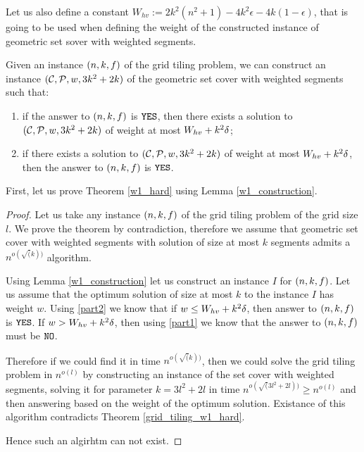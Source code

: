 Let us also define a constant $W_{hv} := 2k^2(n^2+1) -4k^2\epsilon -4k(1-\epsilon)$,
that is going to be used when defining the weight of the constructed
instance of geometric set sover with weighted segments.


\begin{lemma}
\label{w1_construction}
Given an instance $(n,k,f)$ of the grid tiling problem,
we can construct an instance $(\mathcal{C}, \mathcal{P}, w, 3k^2+2k)$ of the geometric set cover
with weighted segments such that:
\begin{enumerate}[label={(\arabic*)}]
\item \label{part1} if the answer to $(n,k,f)$ is $\texttt{YES}$, then there exists a solution
to $(\mathcal{C}, \mathcal{P}, w, 3k^2+2k)$ of weight at most $W_{hv} +k^2\delta$;
\item \label{part2} if there exists a solution to $(\mathcal{C}, \mathcal{P}, w, 3k^2+2k)$ of weight at most $W_{hv} +k^2\delta$,
then the answer to $(n,k,f)$ is $\texttt{YES}$.
\end{enumerate}
\end{lemma}


First, let us prove Theorem \ref{w1_hard} using Lemma \ref{w1_construction}.

\begin{proof}
Let us take any instance $(n,k,f)$ of the grid tiling problem
of the grid size $l$.
We prove the theorem by contradiction, therefore we assume
that geometric set cover with weighted segments
with solution of size at most $k$ segments admits a $n^{o(\sqrt(k))}$ algorithm.

Using Lemma \ref{w1_construction} let us construct an instance $I$
for $(n,k,f)$.
Let us assume that the optimum solution of size at most $k$
to the instance $I$ has weight $w$.
Using \ref{part2} we know that if $w \le W_{hv} +k^2\delta$,
then answer to $(n,k,f)$ is $\texttt{YES}$.
If $w > W_{hv} +k^2\delta$, then using \ref{part1}
we know that the answer to $(n,k,f)$ must be $\texttt{NO}$.

Therefore if we could find it in time $n^{o(\sqrt(k))}$,
then we could solve the grid tiling problem
in $n^{o(l)}$ by constructing an instance of the set cover with
weighted segments, solving it 
for parameter $k = 3l^2+2l$ in time $n^{o(\sqrt(3l^2+2l))} \ge n^{o(l)}$
and then answering based on the weight
of the optimum solution.
Existance of this algorithm contradicts Theorem
\ref{grid_tiling_w1_hard}.

Hence such an algirhtm can not exist.
\end{proof}

